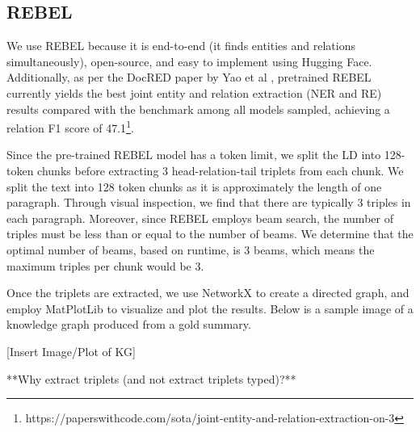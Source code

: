 \subsection*{REBEL}
We use REBEL because it is end-to-end (it finds entities and relations simultaneously), open-source, and easy to implement using Hugging Face. Additionally, as per 
the DocRED paper by Yao et al \cite{yao2019DocRED}, pretrained REBEL currently yields the best joint entity and relation extraction (NER and RE) results compared with 
the benchmark among all models sampled, achieving a relation F1 score of 47.1\footnote{https://paperswithcode.com/sota/joint-entity-and-relation-extraction-on-3}.

Since the pre-trained REBEL model has a token limit, we split the LD into 128-token chunks before extracting 3 head-relation-tail triplets from each chunk. We 
split the text into 128 token chunks as it is approximately the length of one paragraph. Through visual inspection, we find that there are typically 3 triples 
in each paragraph. Moreover, since REBEL employs beam search, the number of triples must be less than or equal to the number of beams. We determine that the optimal number 
of beams, based on runtime, is 3 beams, which means the maximum triples per chunk would be 3.

Once the triplets are extracted, we use NetworkX to create a directed graph, and employ MatPlotLib to visualize and plot the results. Below is a sample image of a knowledge 
graph produced from a gold summary.

[Insert Image/Plot of KG]


**Why extract triplets (and not extract triplets typed)?**